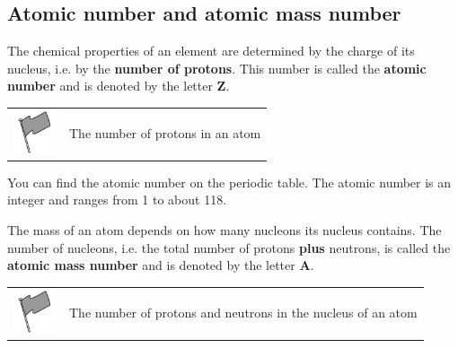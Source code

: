             \subsection{ Atomic number and atomic mass number}
            \nopagebreak
      \label{m38745*id255805}The chemical properties of an element are determined by the charge of
its nucleus, i.e. by the \textbf{number of protons}. This number is
called the \textbf{atomic number} and is denoted by the letter \textbf{Z}.\par 
\label{m38745*fhsst!!!underscore!!!id284}\begin{definition}
	  \begin{tabular*}{15 cm}{m{15 mm}m{}}
	\hspace*{-50pt}  \includegraphics[width=0.5in]{col11305.imgs/psflag2.png}   & \Definition{   \label{id2416514}\textbf{ Atomic number (Z) }} { \label{m38745*meaningfhsst!!!underscore!!!id284}
      \label{m38745*id255833}The number of protons in an atom \par 
       } 
      \end{tabular*}
      \end{definition}
      \label{m38745*eip-164}You can find the atomic number on the periodic table. The atomic number is an integer and ranges from 1 to about 118.\par \label{m38745*id255845}The mass of an atom depends on how many nucleons its nucleus contains.
The number of nucleons, i.e. the total number of protons \textbf{plus} neutrons,
is called the
\textbf{atomic mass number} and is denoted by the letter \textbf{A}.\par 
\label{m38745*fhsst!!!underscore!!!id291}\begin{definition}
	  \begin{tabular*}{15 cm}{m{15 mm}m{}}
	\hspace*{-50pt}  \includegraphics[width=0.5in]{col11305.imgs/psflag2.png}   & \Definition{   \label{id2416571}\textbf{ Atomic mass number (A) }} { \label{m38745*meaningfhsst!!!underscore!!!id291}
      \label{m38745*id255874}The number of protons and neutrons in the nucleus of an atom \par 
       } 
      \end{tabular*}
      \end{definition}
